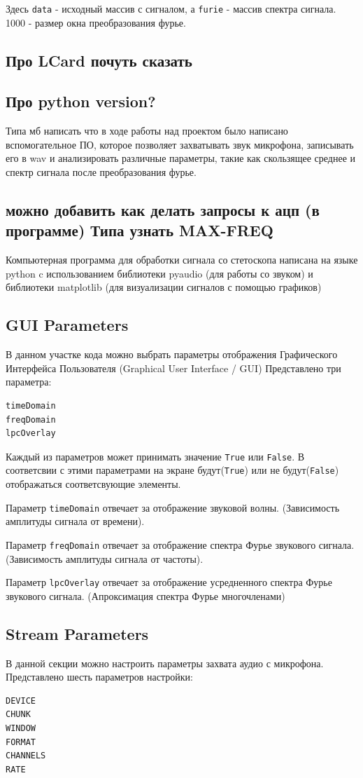 Здесь \verb|data| - исходный массив с сигналом, а \verb|furie| - массив спектра сигнала. 1000 - размер окна преобразования фурье.
\subsection{Про LCard почуть сказать}
\subsection{Про python version?}
Типа мб написать что в ходе работы над проектом было написано вспомогательное ПО, которое позволяет захватывать звук микрофона, записывать его в wav и анализировать различные параметры, такие как скользящее среднее и спектр сигнала после преобразования фурье.
\subsection{можно добавить как делать запросы к ацп (в программе) Типа узнать MAX-FREQ}


Компьютерная программа для обработки сигнала со стетоскопа написана на языке python c использованием библиотеки pyaudio (для работы со звуком) и библиотеки matplotlib (для визуализации сигналов с помощью графиков)
\subsection{GUI Parameters}
В данном участке кода можно выбрать параметры отображения Графического Интерфейса Пользователя (Graphical User Interface / GUI)
Представлено три параметра:
\begin{verbatim}
timeDomain
freqDomain
lpcOverlay
\end{verbatim}

Каждый из параметров может принимать значение \verb|True| или \verb|False|. В соответсвии с этими параметрами на экране будут(\verb|True|) или не будут(\verb|False|) отображаться соответсвующие элементы.

Параметр \verb|timeDomain| отвечает за отображение звуковой волны. (Зависимость амплитуды сигнала от времени). 

Параметр \verb|freqDomain| отвечает за отображение спектра Фурье звукового сигнала. (Зависимость амплитуды сигнала от частоты). 

Параметр \verb|lpcOverlay| отвечает за отображение усредненного спектра Фурье звукового сигнала. (Апроксимация спектра Фурье многочленами)

\subsection{Stream Parameters}
В данной секции можно настроить параметры захвата аудио с микрофона. Представлено шесть параметров настройки:
\begin{verbatim}
DEVICE
CHUNK
WINDOW
FORMAT
CHANNELS
RATE
\end{verbatim}

